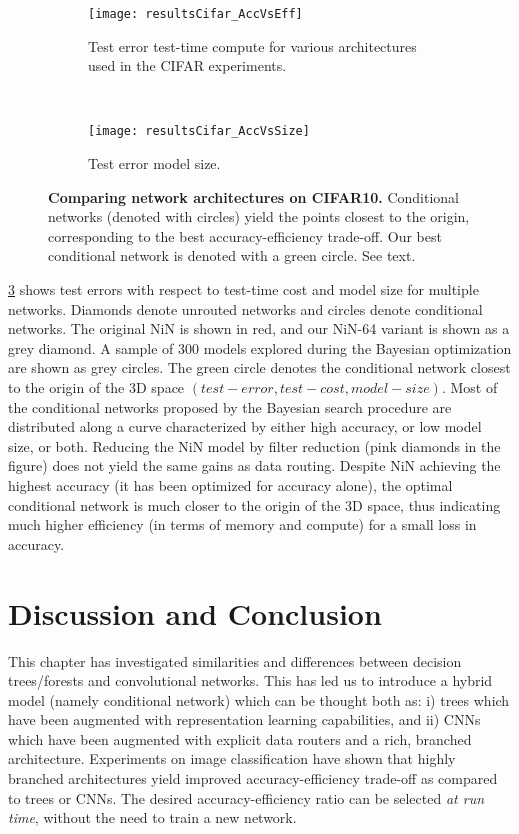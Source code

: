 \documentclass[thesis]{subfiles}
\begin{document}
	
	\begin{figure}[tbp] 
		\centering
		\begin{subfigure}[b]{0.95\linewidth}
			\centering
			\texttt{[image: resultsCifar\_AccVsEff]}
			\caption{Test error \vs test-time compute for various architectures used in the CIFAR experiments.}
			\label{fig:resultsCifar_AccVsEff}
		\end{subfigure}
		~
		\begin{subfigure}[b]{0.95\linewidth}
			\centering
			\texttt{[image: resultsCifar\_AccVsSize]}
			\caption{Test error \vs model size.}
			\label{fig:resultsCifar_AccVsSize}
		\end{subfigure}
		\caption[Comparing network architectures on CIFAR10.]{{\bf Comparing network architectures on CIFAR10.} Conditional networks (denoted with circles) yield the points closest to the origin, corresponding to the best accuracy-efficiency trade-off. Our best conditional network is denoted with a green circle. See text.}
		\label{fig:Cifar_results}
	\end{figure}
	\cref{fig:Cifar_results} shows test errors with respect to test-time cost and model size for multiple networks.
	Diamonds denote unrouted networks and circles denote conditional networks. 
	The original NiN is shown in red, and our NiN-64 variant is shown as a grey diamond.
	A sample of 300 models explored during the Bayesian optimization are shown as grey circles.
	The green circle denotes the conditional network closest to the origin of the 
	3D space $(test-error,test-cost,model-size)$.
	Most of the conditional networks proposed by the Bayesian search procedure are distributed along a curve characterized by either high accuracy, or low model size, or both. 
	Reducing the NiN model by filter reduction (pink diamonds in the figure) does not yield the same gains as data routing.
	Despite NiN achieving the highest accuracy (it has been optimized for accuracy alone), the optimal conditional network is much closer to the origin of the 3D space, thus indicating much higher efficiency (in terms of memory and compute) for a small loss in accuracy.
	
	
	\section{Discussion and Conclusion}


This chapter has investigated similarities and differences between decision trees/forests and convolutional networks. This has led us to introduce a hybrid model (namely conditional network) which can be thought both as:
i) trees which have been augmented with representation learning capabilities, and
ii) CNNs which have been augmented with explicit data routers and a rich, branched architecture.
Experiments on image classification have shown that highly branched architectures yield improved accuracy-efficiency trade-off as compared to trees or CNNs. The desired accuracy-efficiency ratio can be selected {\em at run time}, without the need to train a new network.
	
\end{document}
